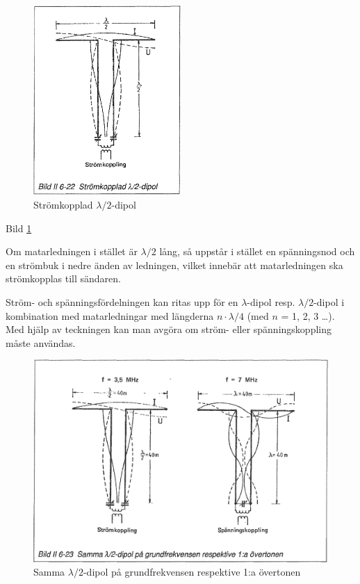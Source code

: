 \begin{figure}
  \includegraphics[width=0.5\textwidth]{images/bild_2_6-22}
  \caption{Strömkopplad \(\lambda/2\)-dipol}
  \label{fig:bildII6-22}
\end{figure}

Bild \ref{fig:bildII6-22}

Om matarledningen i stället är \(\lambda/2\) lång, så uppstår i
stället en spänningsnod och en strömbuk i nedre änden av ledningen,
vilket innebär att matarledningen ska strömkopplas till sändaren.

Ström- och spänningsfördelningen kan ritas upp för en
\(\lambda\)-dipol resp.  \(\lambda/2\)-dipol i kombination med
matarledningar med längderna \(n \cdot \lambda/4\) (med \(n\) = 1, 2,
3 \dots). Med hjälp av teckningen kan man avgöra om ström- eller
spänningskoppling måste användas.

\begin{figure}
  \includegraphics[width=\textwidth]{images/bild_2_6-23}
  \caption{Samma \(\lambda/2\)-dipol på grundfrekvensen respektive 1:a övertonen}
  \label{fig:bildII6-23}
\end{figure}

